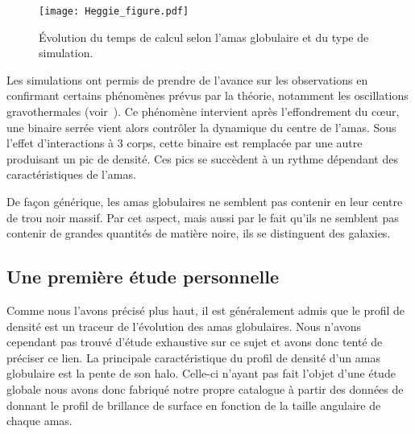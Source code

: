 			\begin{figure}[h]
				\centering \texttt{[image: Heggie\_figure.pdf]}
				\caption{\label{Fig::Intro::HeggieFigure}Évolution du temps de
				calcul selon l'amas globulaire et du type de simulation.}
			\end{figure}

			Les simulations ont permis de prendre de l'avance sur les observations en
			confirmant certains phénomènes prévus par la théorie, notamment
			les oscillations gravothermales (voir~\cite{1996ApJ...471..796M}). Ce phénomène
			intervient après l'effondrement du cœur, une binaire serrée vient alors
			contrôler la dynamique du centre de l'amas. Sous l'effet d'interactions à 3
			corps, cette binaire est remplacée par une autre produisant un pic de
			densité. Ces pics se succèdent à un rythme dépendant des caractéristiques de
			l'amas.

			De façon générique,
			les amas globulaires ne semblent pas contenir
			en leur centre de trou noir massif. Par cet aspect, mais
			aussi par le fait qu'ils ne semblent pas contenir de grandes quantités de
			matière noire, ils se distinguent des galaxies.

		\subsection{Une première étude personnelle}

			Comme nous l'avons précisé plus haut, il est généralement admis que le
			profil de densité est un traceur de l'évolution des amas globulaires. Nous
			n'avons cependant pas trouvé d'étude exhaustive sur ce sujet et avons donc
			tenté de préciser ce lien.
			La principale caractéristique du profil de densité d'un amas globulaire est
			la pente de son halo. Celle-ci n'ayant pas fait l'objet d'une étude globale nous
			avons donc fabriqué notre propre catalogue à partir des données
			de~\cite{Trager-graphe} donnant le profil de brillance de surface en fonction de la taille angulaire
			de chaque amas.



				
